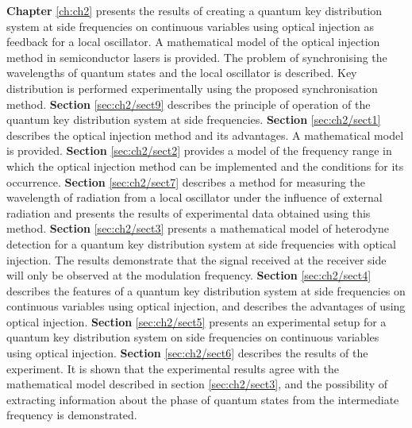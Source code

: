 \newline \textbf{Chapter} \ref{ch:ch2} presents the results of creating a quantum key distribution system at side frequencies on continuous variables using optical injection as feedback for a local oscillator. A mathematical model of the optical injection method in semiconductor lasers is provided. The problem of synchronising the wavelengths of quantum states and the local oscillator is described. Key distribution is performed experimentally using the proposed synchronisation method.
\newline \textbf{Section} \ref{sec:ch2/sect9} describes the principle of operation of the quantum key distribution system at side frequencies.
\newline \textbf{Section} \ref{sec:ch2/sect1} describes the optical injection method and its advantages. A mathematical model is provided.
\newline \textbf{Section} \ref{sec:ch2/sect2} provides a model of the frequency range in which the optical injection method can be implemented and the conditions for its occurrence.
\newline \textbf{Section} \ref{sec:ch2/sect7} describes a method for measuring the wavelength of radiation from a local oscillator under the influence of external radiation and presents the results of experimental data obtained using this method.
\newline \textbf{Section} \ref{sec:ch2/sect3} presents a mathematical model of heterodyne detection for a quantum key distribution system at side frequencies with optical injection. The results demonstrate that the signal received at the receiver side will only be observed at the modulation frequency.
\newline \textbf{Section} \ref{sec:ch2/sect4} describes the features of a quantum key distribution system at side frequencies on continuous variables using optical injection, and describes the advantages of using optical injection.
\newline \textbf{Section} \ref{sec:ch2/sect5} presents an experimental setup for a quantum key distribution system on side frequencies on continuous variables using optical injection.
\newline \textbf{Section} \ref{sec:ch2/sect6} describes the results of the experiment. It is shown that the experimental results agree with the mathematical model described in section \ref{sec:ch2/sect3}, and the possibility of extracting information about the phase of quantum states from the intermediate frequency is demonstrated.
